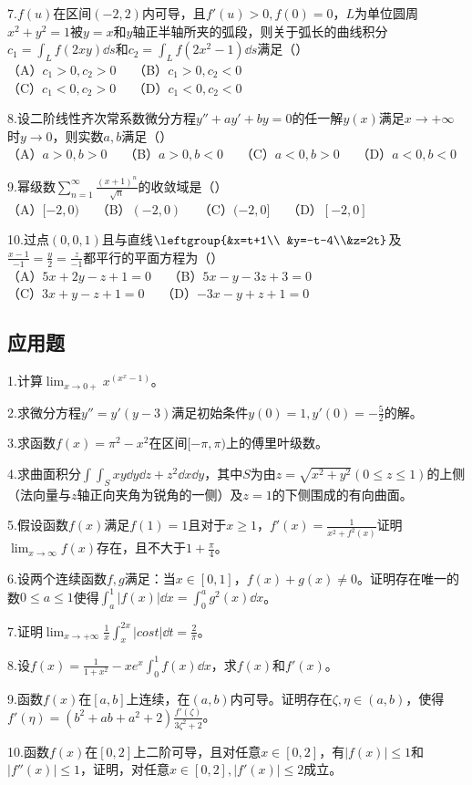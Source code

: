 7.$f(u)$在区间$(-2,2)$内可导，且$f'(u)>0,f(0)=0$，$L$为单位圆周$x^2+y^2=1$被$y=x$和$y$轴正半轴所夹的弧段，则关于弧长的曲线积分$c_1=\int_{L}f(2xy)\dd{s}$和$c_2=\int_{L}f(2x^2-1)\dd{s}$满足（）\\
（A）$c_1>0,c_2>0\quad$ （B）$c_1>0,c_2<0$\\
 （C）$c_1<0,c_2>0\quad$ （D）$c_1<0,c_2<0$

8.设二阶线性齐次常系数微分方程$y''+ay'+by=0$的任一解$y(x)$满足$x \to +\infty$时$y \to 0$，则实数$a,b$满足（）\\
（A）$a>0,b>0\quad$ （B）$a>0,b<0\quad$ （C）$a<0,b>0\quad$ （D）$a<0,b<0$

9.幂级数$\displaystyle \sum_{n=1}^{\infty} \frac{(x+1)^n}{\sqrt{n}}$的收敛域是（）\\
（A）$[-2,0)\quad$ （B）$(-2,0)\quad$ （C）$(-2,0]\quad$ （D）$[-2,0]$

10.过点$(0,0,1)$且与直线$\leftgroup{&x=t+1\\ &y=-t-4\\&z=2t}$及$\frac{x-1}{-1}=\frac{y}{2}=\frac{z}{-1}$都平行的平面方程为（）\\
（A）$5x+2y-z+1=0\quad$ （B）$5x-y-3z+3=0$\\
（C）$3x+y-z+1=0\quad$ （D）$-3x-y+z+1=0$


\subsection{应用题}
1.计算$\displaystyle \lim_{x \to 0+}x^{(x^x-1)}$。


2.求微分方程$y''=y'(y-3)$满足初始条件$y(0)=1,y'(0)=-\frac{5}{2}$的解。


3.求函数$f(x)=\pi ^2-x^2$在区间$[-\pi,\pi)$上的傅里叶级数。

4.求曲面积分$\int \int_{S}xy\dd{y}\dd{z}+z^2\dd{x}\dd{y}$，其中$S$为由$z=\sqrt{x^2+y^2}(0\leqslant z \leqslant 1)$的上侧（法向量与$z$轴正向夹角为锐角的一侧）及$z=1$的下侧围成的有向曲面。

5.假设函数$f(x)$满足$f(1)=1$且对于$x\geqslant 1$，$f'(x)=\frac{1}{x^2+f^2(x)}$证明$\displaystyle \lim_{x \to \infty }f(x)$存在，且不大于$1+\frac{\pi}{4}$。

6.设两个连续函数$f,g$满足：当$x \in [0,1]$，$f(x)+g(x)\neq0$。证明存在唯一的数$0\leqslant a \leqslant 1$使得$\int_{a}^{1}|f(x)|\dd{x}=\int_{0}^{a}g^2(x)\dd{x}$。

7.证明$\displaystyle \lim_{x \to +\infty}\frac{1}{x}\int_x^{2x}|cost|\dd{t}=\frac{2}{\pi}$。

8.设$f(x)=\frac{1}{1+x^2}-xe^x\int_0^1 f(x)\dd{x}$，求$f(x)$和$f'(x)$。

9.函数$f(x)$在$[a,b]$上连续，在$(a,b)$内可导。证明存在$\zeta,\eta \in (a,b)$，使得$f'(\eta)=(b^2+ab+a^2+2)\frac{f'(\zeta)}{3 \zeta ^2 +2}$。

10.函数$f(x)$在$[0,2]$上二阶可导，且对任意$x \in [0,2]$，有$|f(x)| \leqslant  1$和$|f''(x)| \leqslant 1$，证明，对任意$x \in [0,2],|f'(x)|\leqslant 2$成立。

